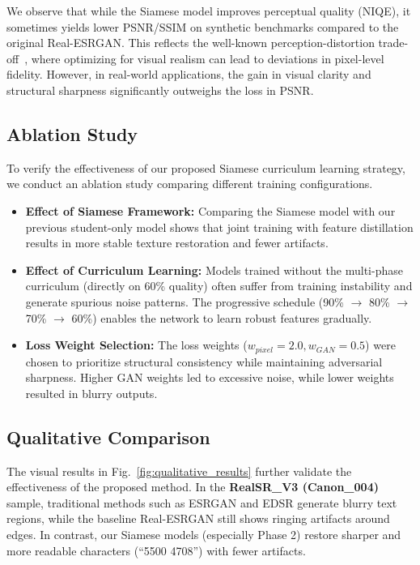 \documentclass[conference]{IEEEtran}
\begin{document}
We observe that while the Siamese model improves perceptual quality (NIQE), it sometimes yields lower PSNR/SSIM on synthetic benchmarks compared to the original Real-ESRGAN. This reflects the well-known perception-distortion trade-off~\cite{blau2018perception}, where optimizing for visual realism can lead to deviations in pixel-level fidelity. However, in real-world applications, the gain in visual clarity and structural sharpness significantly outweighs the loss in PSNR.

\subsection{Ablation Study}
To verify the effectiveness of our proposed Siamese curriculum learning strategy, we conduct an ablation study comparing different training configurations.
\begin{itemize}[nosep,leftmargin=*]
    \item \textbf{Effect of Siamese Framework:} Comparing the Siamese model with our previous student-only model shows that joint training with feature distillation results in more stable texture restoration and fewer artifacts.
    \item \textbf{Effect of Curriculum Learning:} Models trained without the multi-phase curriculum (directly on 60\% quality) often suffer from training instability and generate spurious noise patterns. The progressive schedule (90\% $\to$ 80\% $\to$ 70\% $\to$ 60\%) enables the network to learn robust features gradually.
    \item \textbf{Loss Weight Selection:} The loss weights ($w_{pixel}=2.0, w_{GAN}=0.5$) were chosen to prioritize structural consistency while maintaining adversarial sharpness. Higher GAN weights led to excessive noise, while lower weights resulted in blurry outputs.
\end{itemize}


\subsection{Qualitative Comparison}

The visual results in Fig.~\ref{fig:qualitative_results} further validate the effectiveness of the proposed method. In the \textbf{RealSR\_V3 (Canon\_004)} sample, traditional methods such as ESRGAN and EDSR generate blurry text regions, while the baseline Real-ESRGAN still shows ringing artifacts around edges. In contrast, our Siamese models (especially Phase 2) restore sharper and more readable characters (``5500 4708'') with fewer artifacts.
\end{document}
